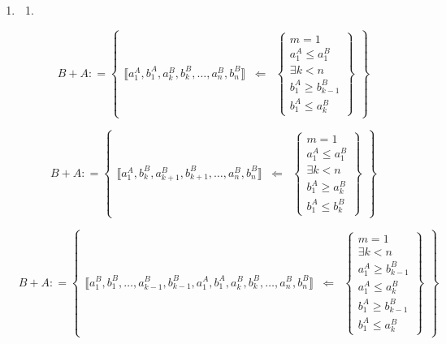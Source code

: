\documentclass[
]{article}
\providecommand{\tightlist}{%
  \setlength{\itemsep}{0pt}\setlength{\parskip}{0pt}}
\begin{document}
\begin{enumerate}
\def\labelenumi{\arabic{enumi}.}
\setcounter{enumi}{3}
\item
  \begin{enumerate}
  \def\labelenumii{\arabic{enumii}.}
  \tightlist
  \item
  \end{enumerate}

  \[{{B + A}{: =}}\begin{Bmatrix}
  {⟦{{a_{1}^{A},b_{1}^{A}},{a_{k}^{B},b_{k}^{B}},\ldots,{a_{n}^{B},b_{n}^{B}}}⟧} & \Leftarrow & \begin{Bmatrix}
  {m = 1} \\
  {a_{1}^{A} \leq a_{1}^{B}} \\
  {\exists{k < n}} \\
  {b_{1}^{A} \geq b_{k - 1}^{B}} \\
  {b_{1}^{A} \leq a_{k}^{B}}
  \end{Bmatrix}
  \end{Bmatrix}\]

  \[{{B + A}{: =}}\begin{Bmatrix}
  {⟦{{a_{1}^{A},b_{k}^{B}},{a_{k + 1}^{B},b_{k + 1}^{B}},\ldots,{a_{n}^{B},b_{n}^{B}}}⟧} & \Leftarrow & \begin{Bmatrix}
  {m = 1} \\
  {a_{1}^{A} \leq a_{1}^{B}} \\
  {\exists{k < n}} \\
  {b_{1}^{A} \geq a_{k}^{B}} \\
  {b_{1}^{A} \leq b_{k}^{B}}
  \end{Bmatrix}
  \end{Bmatrix}\]

  \[{{B + A}{: =}}\begin{Bmatrix}
  {⟦{{a_{1}^{B},b_{1}^{B}},\ldots,{a_{k - 1}^{B},b_{k - 1}^{B}},{a_{1}^{A},b_{1}^{A}},{a_{k}^{B},b_{k}^{B}},\ldots,{a_{n}^{B},b_{n}^{B}}}⟧} & \Leftarrow & \begin{Bmatrix}
  {m = 1} \\
  {\exists{k < n}} \\
  {a_{1}^{A} \geq b_{k - 1}^{B}} \\
  {a_{1}^{A} \leq a_{k}^{B}} \\
  {b_{1}^{A} \geq b_{k - 1}^{B}} \\
  {b_{1}^{A} \leq a_{k}^{B}}
  \end{Bmatrix}
  \end{Bmatrix}\]


\end{enumerate}
\end{document}
